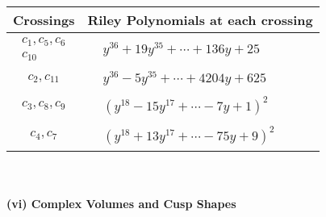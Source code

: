 \documentclass[1p]{elsarticle_modified}
\theoremstyle{definition}
\begin{document}
\begin{tabular}{m{50pt}|m{274pt}}
Crossings & \hspace{64pt}Riley Polynomials at each crossing \\
\hline $$\begin{aligned}c_{1},c_{5},c_{6}\\c_{10}\end{aligned}$$&$\begin{aligned}
&y^{36}+19 y^{35}+\cdots+136 y+25
\end{aligned}$\\
\hline $$\begin{aligned}c_{2},c_{11}\end{aligned}$$&$\begin{aligned}
&y^{36}-5 y^{35}+\cdots+4204 y+625
\end{aligned}$\\
\hline $$\begin{aligned}c_{3},c_{8},c_{9}\end{aligned}$$&$\begin{aligned}
&(y^{18}-15 y^{17}+\cdots-7 y+1)^{2}
\end{aligned}$\\
\hline $$\begin{aligned}c_{4},c_{7}\end{aligned}$$&$\begin{aligned}
&(y^{18}+13 y^{17}+\cdots-75 y+9)^{2}
\end{aligned}$\\
\hline
\end{tabular}\\~\\
\newpage\flushleft \textbf{(vi) Complex Volumes and Cusp Shapes}
\end{document}
